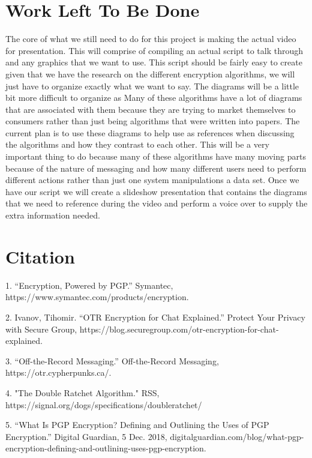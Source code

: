 \documentclass{article}
\begin{document}
\section{Work Left To Be Done}

The core of what we still need to do for this project is making the actual video for presentation. This will comprise of compiling an actual script to talk through and any graphics that we want to use. This script should be fairly easy to create given that we have the research on the different encryption algorithms, we will just have to organize exactly what we want to say. The diagrams will be a little bit more difficult to organize as Many of these algorithms have a lot of diagrams that are associated with them because they are trying to market themselves to consumers rather than just being algorithms that were written into papers. The current plan is to use these diagrams to help use as references when discussing the algorithms and how they contrast to each other. This will be a very important thing to do because many of these algorithms have many moving parts because of the nature of messaging and how many different users need to perform different actions rather than just one system manipulations a data set. Once we have our script we will create a slideshow presentation that contains the diagrams that we need to reference during the video and perform a voice over to supply the extra information needed. 

\section{Citation}

1. “Encryption, Powered by PGP.” Symantec, https://www.symantec.com/products/encryption.

2. Ivanov, Tihomir. “OTR Encryption for Chat Explained.” Protect Your Privacy with Secure Group, https://blog.securegroup.com/otr-encryption-for-chat-explained.

3. “Off-the-Record Messaging.” Off-the-Record Messaging, https://otr.cypherpunks.ca/.

4. "The Double Ratchet Algorithm." RSS, https://signal.org/dogs/specifications/doubleratchet/
	    
5. “What Is PGP Encryption? Defining and Outlining the Uses of PGP Encryption.” Digital Guardian, 5 Dec. 2018, digitalguardian.com/blog/what-pgp-encryption-defining-and-outlining-uses-pgp-encryption.
\end{document}
